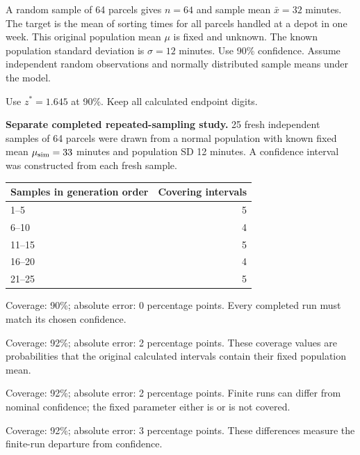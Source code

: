 A random sample of 64 parcels gives $n=64$ and sample mean $\bar{x}=32$ minutes. The target is the mean of sorting times for all parcels handled at a depot in one week. This original population mean $\mu$ is fixed and unknown. The known population standard deviation is $\sigma=12$ minutes. Use 90\% confidence. Assume independent random observations and normally distributed sample means under the model.

Use $z^*=1.645$ at 90\%. Keep all calculated endpoint digits.

\textbf{Separate completed repeated-sampling study.} 25 fresh independent samples of 64 parcels were drawn from a normal population with known fixed mean $\mu_{\rm sim}=33$ minutes and population SD 12 minutes. A confidence interval was constructed from each fresh sample.
\begin{center}\begin{tabular}{@{}lr@{}}\toprule
Samples in generation order & Covering intervals\\\midrule
1--5 & 5 \\[6pt]
6--10 & 4 \\[6pt]
11--15 & 5 \\[6pt]
16--20 & 4 \\[6pt]
21--25 & 5 \\[6pt]
\bottomrule\end{tabular}\end{center}

\begin{answeroptions}
\item Coverage: 90\%; absolute error: 0 percentage points. Every completed run must match its chosen confidence.
\item Coverage: 92\%; absolute error: 2 percentage points. These coverage values are probabilities that the original calculated intervals contain their fixed population mean.
\item Coverage: 92\%; absolute error: 2 percentage points. Finite runs can differ from nominal confidence; the fixed parameter either is or is not covered.
\item Coverage: 92\%; absolute error: 3 percentage points. These differences measure the finite-run departure from confidence.
\end{answeroptions}
\clearpage
